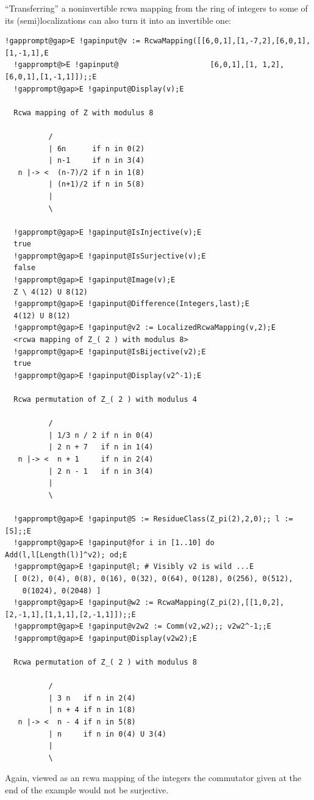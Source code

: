 \documentclass[a4paper,11pt]{report}
\begin{document}
{{ ``Transferring'' a non\texttt{}invertible rcwa mapping from the ring of integers to
some of its (semi)localizations can also turn it into an invertible one: 
\begin{Verbatim}[commandchars=!@E,fontsize=\small,frame=single,label=Example]
  !gapprompt@gap>E !gapinput@v := RcwaMapping([[6,0,1],[1,-7,2],[6,0,1],[1,-1,1],E
  !gapprompt@>E !gapinput@                     [6,0,1],[1, 1,2],[6,0,1],[1,-1,1]]);;E
  !gapprompt@gap>E !gapinput@Display(v);E
  
  Rcwa mapping of Z with modulus 8
  
          /
          | 6n      if n in 0(2)
          | n-1     if n in 3(4)
   n |-> <  (n-7)/2 if n in 1(8)
          | (n+1)/2 if n in 5(8)
          |
          \
  
  !gapprompt@gap>E !gapinput@IsInjective(v);E
  true
  !gapprompt@gap>E !gapinput@IsSurjective(v);E
  false
  !gapprompt@gap>E !gapinput@Image(v);E
  Z \ 4(12) U 8(12)
  !gapprompt@gap>E !gapinput@Difference(Integers,last);E
  4(12) U 8(12)
  !gapprompt@gap>E !gapinput@v2 := LocalizedRcwaMapping(v,2);E
  <rcwa mapping of Z_( 2 ) with modulus 8>
  !gapprompt@gap>E !gapinput@IsBijective(v2);E
  true
  !gapprompt@gap>E !gapinput@Display(v2^-1);E
  
  Rcwa permutation of Z_( 2 ) with modulus 4
  
          /
          | 1/3 n / 2 if n in 0(4)
          | 2 n + 7   if n in 1(4)
   n |-> <  n + 1     if n in 2(4)
          | 2 n - 1   if n in 3(4)
          |
          \
  
  !gapprompt@gap>E !gapinput@S := ResidueClass(Z_pi(2),2,0);; l := [S];;E
  !gapprompt@gap>E !gapinput@for i in [1..10] do Add(l,l[Length(l)]^v2); od;E
  !gapprompt@gap>E !gapinput@l; # Visibly v2 is wild ...E
  [ 0(2), 0(4), 0(8), 0(16), 0(32), 0(64), 0(128), 0(256), 0(512),
    0(1024), 0(2048) ]
  !gapprompt@gap>E !gapinput@w2 := RcwaMapping(Z_pi(2),[[1,0,2],[2,-1,1],[1,1,1],[2,-1,1]]);;E
  !gapprompt@gap>E !gapinput@v2w2 := Comm(v2,w2);; v2w2^-1;;E
  !gapprompt@gap>E !gapinput@Display(v2w2);E
  
  Rcwa permutation of Z_( 2 ) with modulus 8
  
          /
          | 3 n   if n in 2(4)
          | n + 4 if n in 1(8)
   n |-> <  n - 4 if n in 5(8)
          | n     if n in 0(4) U 3(4)
          |
          \
\end{Verbatim}
 Again, viewed as an rcwa mapping of the integers the commutator given at the
end of the example would not be surjective. 

}}
\end{document}
